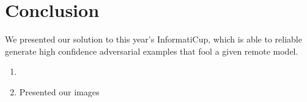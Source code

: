 \section{Conclusion}

We presented our solution to this year's InformatiCup, which is able to reliable generate high confidence adversarial examples that fool a given remote model.



\begin{enumerate}
\item 
\item Presented our images
\end{enumerate}